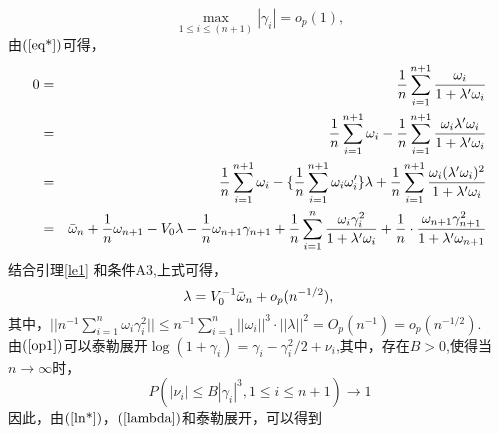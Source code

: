 \documentclass[a4paper,c5size,onecolumn,twoside,cap,Chinese]{APSart}
\begin{document}
\begin{equation}
\max_{ 1\leq i\leq (n+1)} |  \gamma_i |=o_p(1) ,\label{op1}
\end{equation}
由$\rm(\ref{eq*}) $可得，
\begin{eqnarray*}
0 &=&{1 \over n}\sum^{n+1}_{i=1}{\omega_i \over 1+\lambda'\omega_i}\\
&=&{1 \over n}\sum^{n+1}_{i=1}{\omega_i}-{1 \over n}\sum^{n+1}_{i=1}{\omega_i\lambda'\omega_i \over 1+\lambda'\omega_i} \\
&=&{1 \over n}\sum^{n+1}_{i=1}{\omega_i}-\{{1 \over n}\sum^{n+1}_{i=1}\omega_i\omega_i '\}\lambda+{1 \over n}\sum^{n+1}_{i=1}{\omega_i(\lambda'\omega_i)^2 \over 1+\lambda'\omega_i}\\
&=&\bar{\omega}_n+{1 \over n}\omega_{n+1}-V_0\lambda-{1 \over n}\omega_{n+1}\gamma_{n+1}+{1 \over n}\sum^{n}_{i=1}{\omega_i\gamma_i^2 \over 1+\lambda'\omega_i}+{1 \over n} \cdot {\omega_{n+1}\gamma_{n+1}^2 \over 1+\lambda'\omega_{n+1}}
\end{eqnarray*}
结合引理\ref{le1} 和条件A3,上式可得，
\begin{equation}
\lambda=V_0^{-1}\bar{\omega}_{n}+o_p(n^{-1/2}),\label{lambda}\\
\end{equation}
其中，$||n^{-1}\sum^{n}_{i=1}\omega_i\gamma_i^2||\le n^{-1}\sum^{n}_{i=1}||\omega_i||^3 \cdot||\lambda||^2=O_p(n^{-1})=o_p(n^{-1/2})$.\\
由$\rm(\ref{op1}) $可以泰勒展开$\log(1+\gamma_i)=\gamma_i-\gamma_i^2/2+\nu_i$,其中，存在$B>0$,使得当$n \to \infty$时，
$$P(|\nu_i| \le B|\gamma_i|^3,1 \le i \le n+1) \to 1$$
因此，由$\rm(\ref{ln*}) $，$\rm(\ref{lambda}) $和泰勒展开，可以得到
\end{document}
